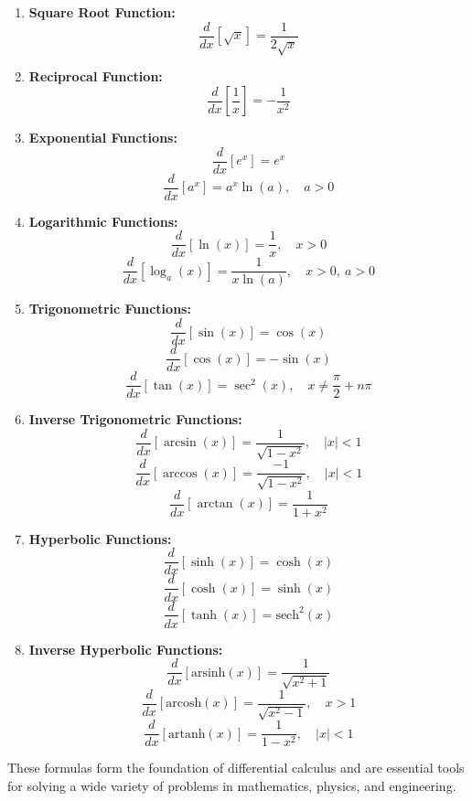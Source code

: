 \documentclass[a4paper,12pt]{article}
\begin{document}
\begin{enumerate}
    \item \textbf{Square Root Function:}
    \[ \frac{d}{dx}[\sqrt{x}] = \frac{1}{2\sqrt{x}} \]

    \item \textbf{Reciprocal Function:}
    \[ \frac{d}{dx}\left[\frac{1}{x}\right] = -\frac{1}{x^2} \]

    \item \textbf{Exponential Functions:}
    \[ \frac{d}{dx}[e^x] = e^x \]
    \[ \frac{d}{dx}[a^x] = a^x \ln(a), \quad a > 0 \]

    \item \textbf{Logarithmic Functions:}
    \[ \frac{d}{dx}[\ln(x)] = \frac{1}{x}, \quad x > 0 \]
    \[ \frac{d}{dx}[\log_a(x)] = \frac{1}{x \ln(a)}, \quad x > 0, \ a > 0 \]

    \item \textbf{Trigonometric Functions:}
    \[ \frac{d}{dx}[\sin(x)] = \cos(x) \]
    \[ \frac{d}{dx}[\cos(x)] = -\sin(x) \]
    \[ \frac{d}{dx}[\tan(x)] = \sec^2(x), \quad x \neq \frac{\pi}{2} + n\pi \]

    \item \textbf{Inverse Trigonometric Functions:}
    \[ \frac{d}{dx}[\arcsin(x)] = \frac{1}{\sqrt{1-x^2}}, \quad |x| < 1 \]
    \[ \frac{d}{dx}[\arccos(x)] = \frac{-1}{\sqrt{1-x^2}}, \quad |x| < 1 \]
    \[ \frac{d}{dx}[\arctan(x)] = \frac{1}{1+x^2} \]

    \item \textbf{Hyperbolic Functions:}
    \[ \frac{d}{dx}[\sinh(x)] = \cosh(x) \]
    \[ \frac{d}{dx}[\cosh(x)] = \sinh(x) \]
    \[ \frac{d}{dx}[\tanh(x)] = \text{sech}^2(x) \]

    \item \textbf{Inverse Hyperbolic Functions:}
    \[ \frac{d}{dx}[\text{arsinh}(x)] = \frac{1}{\sqrt{x^2+1}} \]
    \[ \frac{d}{dx}[\text{arcosh}(x)] = \frac{1}{\sqrt{x^2-1}}, \quad x > 1 \]
    \[ \frac{d}{dx}[\text{artanh}(x)] = \frac{1}{1-x^2}, \quad |x| < 1 \]
\end{enumerate}

These formulas form the foundation of differential calculus and are essential tools for solving a wide variety of problems in mathematics, physics, and engineering.
\end{document}
